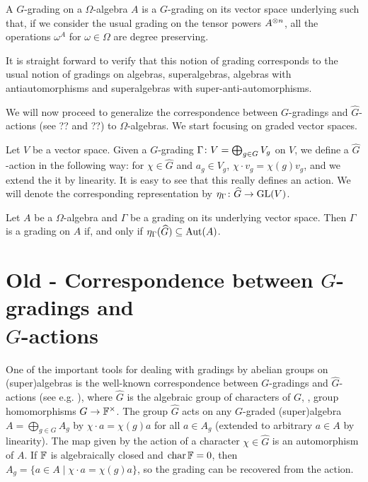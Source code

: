 \begin{defi}
    A $G$-grading on a $\Omega$-algebra $A$ is a $G$-grading on its vector space underlying such that, if we consider the usual grading on the tensor powers $A^{\otimes n}$, all the operations $\omega^A$ for $\omega \in \Omega$ are degree preserving.
\end{defi}

It is straight forward to verify that this notion of grading corresponds to the usual notion of gradings on algebras, superalgebras, algebras with antiautomorphisms and superalgebras with super-anti-automorphisms.

We will now proceed to generalize the correspondence between $G$-gradings and $\widehat G$-actions (see ?? and ??) to $\Omega$-algebras. 
We start focusing on graded vector spaces.

Let $V$ be a vector space. 
Given a $G$-grading $\Gamma\colon V= \bigoplus_{g\in G} V_g$ on $V$, we define a $\widehat G$-action in the following way: for $\chi \in \widehat G$ and $a_g \in V_g$, $\chi \cdot v_g = \chi(g)v_g$, and we extend the it by linearity. 
It is easy to see that this really defines an action. 
We will denote the corresponding representation by $\eta_\Gamma\colon \widehat G \to \operatorname{GL}(V)$.

\begin{prop}
    Let $A$ be a $\Omega$-algebra and $\Gamma$ be a grading on its underlying vector space. 
    Then $\Gamma$ is a grading on $A$ if, and only if $\eta_\Gamma(\widehat G) \subseteq \operatorname{Aut}(A)$.
\end{prop}



\section{Old - Correspondence between $G$-gradings and\\ $\widehat G$-actions}\label{ssec:G-hat-action}

One of the important tools for dealing with gradings by abelian groups on (super)algebras is the well-known correspondence between  $G$-gradings and $\widehat G$-actions (see e.g. \cite[\S 1.4]{livromicha}), where $\widehat G$ is the algebraic group of characters of $G$, \ie, group homomorphisms $G \rightarrow \mathbb{F}^{\times}$. The group $\widehat{G}$ acts on any $G$-graded (super)algebra $A = \bigoplus_{g\in G} A_g$ by $\chi \cdot a = \chi(g) a$ for all $a\in A_g$ (extended to arbitrary $a\in A$ by linearity). The map given by the action of a character $\chi \in \widehat{G}$ is an automorphism of $A$. If $\mathbb{F}$ is algebraically closed and $\operatorname{char} \mathbb{F} = 0$, then $A_g = \{ a\in A \mid \chi \cdot a = \chi (g) a\}$, so the grading can be recovered from the action.

